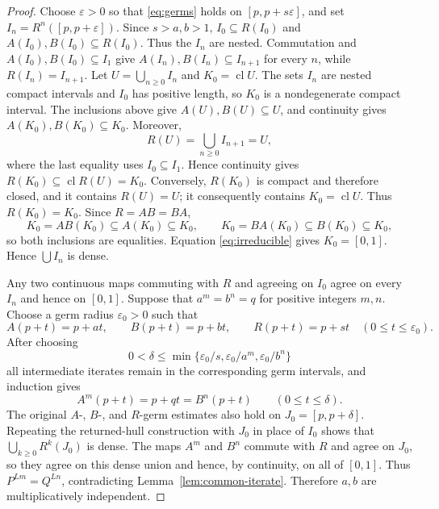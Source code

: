 \documentclass[11pt]{article}
\newcommand{\I}{[0,1]}
\newcommand{\cl}{\operatorname{cl}}
\begin{document}
\begin{proof}
Choose $\varepsilon>0$ so that \eqref{eq:germs} holds on $[p,p+s\varepsilon]$, and set
$I_n=R^n([p,p+\varepsilon])$. Since $s>a,b>1$,
$I_0\subseteq R(I_0)$ and $A(I_0),B(I_0)\subseteq R(I_0)$. Thus the $I_n$ are nested. Commutation and $A(I_0),B(I_0)\subseteq I_1$ give
$A(I_n),B(I_n)\subseteq I_{n+1}$ for every $n$, while
$R(I_n)=I_{n+1}$. Let $U=\bigcup_{n\geq0}I_n$ and $K_0=\cl U$. The sets $I_n$ are nested compact
intervals and $I_0$ has positive length, so $K_0$ is a nondegenerate compact interval. The inclusions
above give $A(U),B(U)\subseteq U$, and continuity gives
$A(K_0),B(K_0)\subseteq K_0$. Moreover,
\[
R(U)=\bigcup_{n\geq0}I_{n+1}=U,
\]
where the last equality uses $I_0\subseteq I_1$. Hence continuity gives
$R(K_0)\subseteq\cl R(U)=K_0$. Conversely, $R(K_0)$ is compact and therefore closed, and it contains
$R(U)=U$; it consequently contains $K_0=\cl U$. Thus $R(K_0)=K_0$. Since
$R=AB=BA$,
\[
K_0=AB(K_0)\subseteq A(K_0)\subseteq K_0,
\qquad
K_0=BA(K_0)\subseteq B(K_0)\subseteq K_0,
\]
so both inclusions are equalities. Equation \eqref{eq:irreducible} gives $K_0=\I$. Hence
$\bigcup I_n$ is dense.

Any two continuous maps commuting with $R$ and agreeing on $I_0$ agree on every $I_n$ and hence on
$\I$. Suppose that $a^m=b^n=q$ for positive integers $m,n$. Choose a germ radius
$\varepsilon_0>0$ such that
\[
A(p+t)=p+at,\qquad B(p+t)=p+bt,\qquad R(p+t)=p+st
\quad(0\leq t\leq\varepsilon_0).
\]
After choosing
\[
0<\delta\leq
\min\{\varepsilon_0/s,\varepsilon_0/a^m,\varepsilon_0/b^n\}
\]
all intermediate iterates remain in the corresponding germ intervals, and induction gives
\[
A^m(p+t)=p+qt=B^n(p+t)\qquad(0\leq t\leq\delta).
\]
The original $A$-, $B$-, and $R$-germ estimates also hold on $J_0=[p,p+\delta]$. Repeating the
returned-hull construction with $J_0$ in place of $I_0$ shows that
$\bigcup_{k\geq0}R^k(J_0)$ is dense. The maps $A^m$ and $B^n$ commute with $R$ and agree on $J_0$,
so they agree on this dense union and hence, by continuity, on all of $\I$. Thus
$P^{Lm}=Q^{Ln}$, contradicting Lemma~\ref{lem:common-iterate}. Therefore $a,b$ are multiplicatively
independent.


\end{proof}
\end{document}
